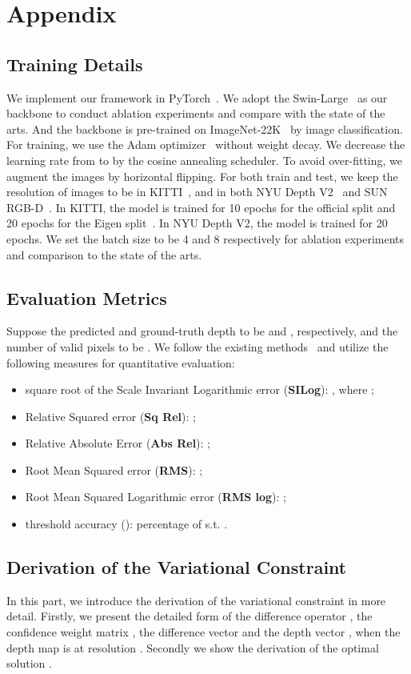 \documentclass{article} \usepackage{iclr2023_conference, times}
\begin{document}
\appendix
\section{Appendix}
\subsection{Training Details}
We implement our framework in PyTorch~\citep{paszke2019pytorch}. We adopt the Swin-Large~\citep{liu2021swin} as our backbone to conduct ablation experiments and compare with the state of the arts. And the backbone is pre-trained on ImageNet-22K~\citep{deng2009imagenet} by image classification. For training, we use the Adam optimizer~\citep{kingma2014adam} without weight decay. We decrease the learning rate from  to  by the cosine annealing scheduler. To avoid over-fitting, we augment the images by horizontal flipping. For both train and test, we keep the resolution of images to be  in KITTI~\citep{geiger2012we}, and  in both NYU Depth V2~\citep{silberman2012indoor} and SUN RGB-D~\citep{song2015sun}. In KITTI, the model is trained for 10 epochs for the official split and 20 epochs for the Eigen split~\citep{eigen2014depth}. In NYU Depth V2, the model is trained for 20 epochs. We set the batch size to be 4 and 8 respectively for ablation experiments and comparison to the state of the arts. 
\subsection{Evaluation Metrics}
\label{sec:evaluation_metrics}
Suppose the predicted and ground-truth depth to be  and , respectively, and the number of valid pixels to be . 
We follow the existing methods~\citep{yuan2022new} and utilize the following measures for quantitative evaluation: 
\begin{itemize}
\item square root of the Scale Invariant Logarithmic error (\textbf{SILog}): ,  where ; 
\item Relative Squared error (\textbf{Sq Rel}): ; 
\item Relative Absolute Error (\textbf{Abs Rel}): ; 
\item Root Mean Squared error (\textbf{RMS}): ; 
\item Root Mean Squared Logarithmic error (\textbf{RMS log}): ; 
\item threshold accuracy (): percentage of  s.t. .
\end{itemize}

\subsection{Derivation of the Variational Constraint}
In this part, we introduce the derivation of the variational constraint in more detail. Firstly, we present the detailed form of the difference operator , the confidence weight matrix , the difference vector  and the depth vector , when the depth map  is at resolution . Secondly we show the derivation of the optimal solution .  
\end{document}
